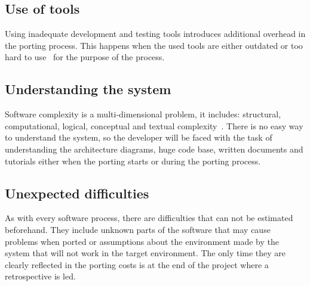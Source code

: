 \subsection{Use of tools}
Using inadequate development and testing tools introduces additional
overhead in the porting process. This happens when the used tools are either
outdated or too hard to use~ for the purpose of the process.

\subsection{Understanding the system}
Software complexity is a multi-dimensional problem, it includes: structural,
computational, logical, conceptual and textual complexity~\cite{ejiogu}. There
is no easy way to understand the system, so the developer will be faced with the
task of understanding the architecture diagrams, huge code base, written
documents and tutorials either when the porting starts or during the porting
process.

\subsection{Unexpected difficulties}
As with every software process, there are difficulties
that can not be estimated beforehand. They include unknown parts of the software
that may cause problems when ported or assumptions about the environment made by
the system that will not work in the target environment. The only time they
are clearly reflected in the porting costs is at the end of the project where
a retrospective is led.~
